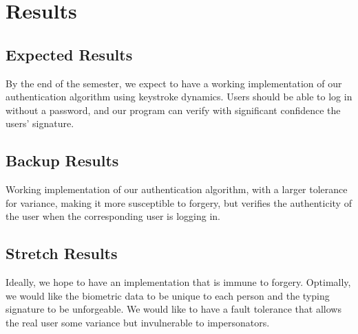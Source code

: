 \documentclass[letterpaper,12pt]{article}
\begin{document}
\section{Results}
\subsection{Expected Results}
By the end of the semester, we expect to have a working implementation of our authentication algorithm using keystroke dynamics.  Users should be able to log in without a password, and our program can verify with significant confidence the users' signature.  

\subsection{Backup Results}
Working implementation of our authentication algorithm, with a larger tolerance for variance, making it more susceptible to forgery, but verifies the authenticity of the user when the corresponding user is logging in.

\subsection{Stretch Results}
Ideally, we hope to have an implementation that is immune to forgery. Optimally, we would like the biometric data to be unique to each person and the typing signature to be unforgeable.  We would like to have a fault tolerance that allows the real user some variance but invulnerable to impersonators. 
\nocite{*}


 
\end{document}
